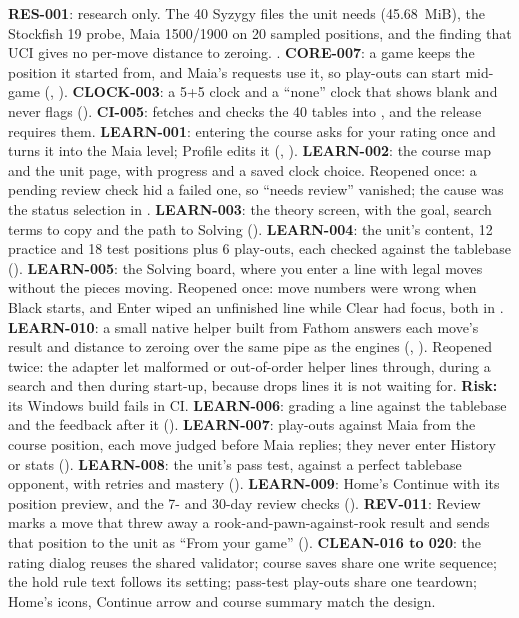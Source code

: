 \documentclass[11pt,a4paper]{article}
\begin{document}
\textbf{RES-001}: research only. The 40 Syzygy files the unit needs (45.68~MiB), the Stockfish
19 probe, Maia 1500/1900 on 20 sampled positions, and the finding that UCI gives no per-move
distance to zeroing. .
\textbf{CORE-007}: a game keeps the position it started from, and Maia's requests use it, so
play-outs can start mid-game (, ).
\textbf{CLOCK-003}: a 5+5 clock and a ``none'' clock that shows blank and never flags
().
\textbf{CI-005}:  fetches and checks the 40 tables into
, and the release requires them.
\textbf{LEARN-001}: entering the course asks for your rating once and turns it into the Maia
level; Profile edits it (, ).
\textbf{LEARN-002}: the course map and the unit page, with progress and a saved clock choice.
Reopened once: a pending review check hid a failed one, so ``needs review'' vanished; the cause
was the status selection in .
\textbf{LEARN-003}: the theory screen, with the goal, search terms to copy and the path to
Solving ().
\textbf{LEARN-004}: the unit's content, 12 practice and 18 test positions plus 6 play-outs, each
checked against the tablebase ().
\textbf{LEARN-005}: the Solving board, where you enter a line with legal moves without the pieces
moving. Reopened once: move numbers were wrong when Black starts, and Enter wiped an unfinished
line while Clear had focus, both in .
\textbf{LEARN-010}: a small native helper built from Fathom answers each move's result and distance
to zeroing over the same pipe as the engines (,
). Reopened twice: the adapter let malformed or out-of-order helper
lines through, during a search and then during start-up, because  drops lines
it is not waiting for. \textbf{Risk:} its Windows build fails in CI.
\textbf{LEARN-006}: grading a line against the tablebase and the feedback after it
().
\textbf{LEARN-007}: play-outs against Maia from the course position, each move judged before
Maia replies; they never enter History or stats ().
\textbf{LEARN-008}: the unit's pass test, against a perfect tablebase opponent, with retries and
mastery ().
\textbf{LEARN-009}: Home's Continue with its position preview, and the 7- and 30-day review
checks ().
\textbf{REV-011}: Review marks a move that threw away a rook-and-pawn-against-rook result and
sends that position to the unit as ``From your game'' ().
\textbf{CLEAN-016 to 020}: the rating dialog reuses the shared validator; course saves share one
write sequence; the hold rule text follows its setting; pass-test play-outs share one teardown;
Home's icons, Continue arrow and course summary match the design.
\end{document}
